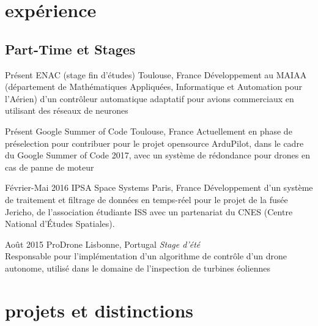 \documentclass[a4paper]{friggeri-cv} %
\begin{document}

\section{expérience}


\subsection{Part-Time et Stages}

\begin{entrylist}
\entry
{Présent}
{ENAC (stage fin d'études)}
{Toulouse, France}
{Développement au MAIAA (département de Mathématiques Appliquées, Informatique et Automation pour l'Aérien) d'un contrôleur automatique adaptatif pour avions commerciaux en utilisant des réseaux de neurones}

\entry
{Présent}
{Google Summer of Code}
{Toulouse, France}
{Actuellement en phase de préselection pour contribuer pour le projet opensource ArduPilot, dans le cadre du Google Summer of Code 2017, avec un système de rédondance pour drones en cas de panne de moteur}


\entry
{Février-Mai 2016}
{IPSA Space Systems}
{Paris, France}
{Développement d'un système de traitement et filtrage de données en temps-réel pour le projet de la fusée Jericho, de l'association étudiante ISS avec un partenariat du CNES (Centre National d'Études Spatiales).}


\entry
{Août 2015}
{ProDrone}
{Lisbonne, Portugal}
{\emph{Stage d'été} \\
Responsable pour l'implémentation d'un algorithme de contrôle d'un drone autonome, utilisé dans le domaine de l'inspection de turbines éoliennes}



\end{entrylist}


\section{projets et distinctions}
\end{document}
